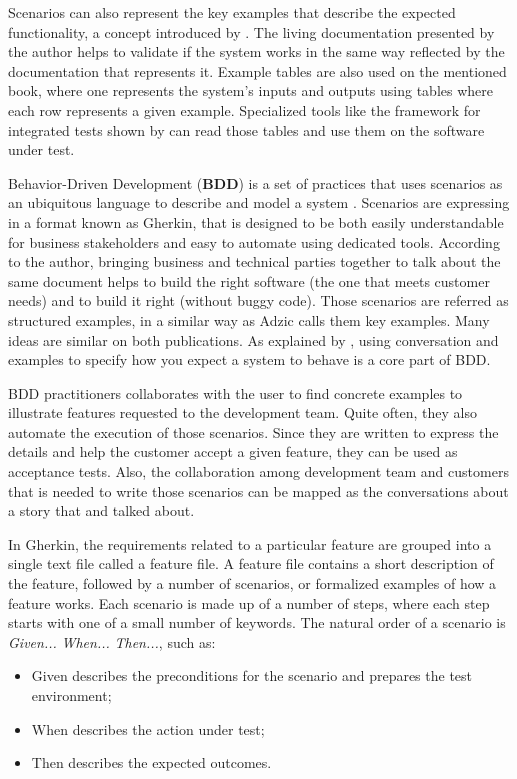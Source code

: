 Scenarios can also represent the key examples that describe the expected functionality, a concept introduced by \cite{Adzic_2011}. The living documentation presented by the author helps to validate if the system works in the same way reflected by the documentation that represents it. Example tables are also used on the mentioned book, where one represents the system's inputs and outputs using tables where each row represents a given example. Specialized tools like the framework for integrated tests shown by \cite{Gartner_2012} can read those tables and use them on the software under test. 


Behavior-Driven Development (\textbf{BDD}) is a set of practices that uses scenarios as an ubiquitous language to describe and model a system \cite{Smart_2014}. Scenarios are expressing in a format known as Gherkin, that is designed to be both easily understandable for business stakeholders and easy to automate using dedicated tools. According to the author, bringing business and technical parties together to talk about the same document helps to build the right software (the one that meets customer needs) and to build it right (without buggy code). Those scenarios are referred as structured examples, in a similar way as Adzic \cite{Adzic_2011} calls them key examples. Many ideas are similar on both publications. As explained by \cite{Smart_2014}, using conversation and examples to specify how you expect a system to behave is a core part of BDD. 

BDD practitioners collaborates with the user to find concrete examples to illustrate features requested to the development team. Quite often, they also automate the execution of those scenarios. Since they are written to express the details and help the customer accept a given feature, they can be used as acceptance tests. Also, the collaboration among development team and customers that is needed to write those scenarios can be mapped as the conversations about a story that \cite{Cohn_2004} and \cite{Jeffries_2001} talked about.

In Gherkin, the requirements related to a particular feature are grouped into a single text file called a feature file. A feature file contains a short description of the feature, followed by a number of scenarios, or formalized examples of how a feature works. Each scenario is made up of a number of steps, where each step starts with one of a small number of keywords. The natural order of a scenario is \textit{Given...} \textit{When...} \textit{Then...}, such as:
\begin{itemize}
    \item Given describes the preconditions for the scenario and prepares the test environment;
    \item When describes the action under test;
    \item Then describes the expected outcomes.
\end{itemize}

